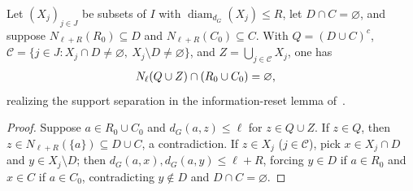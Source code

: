 \begin{lemma}
    \label{thm:qc_graph_support_separation}
    \leanok
    Let $(X_j)_{j\in J}$ be subsets of $I$ with $\operatorname{diam}_{d_G}(X_j)\le R$, let $D\cap C=\varnothing$, and suppose $N_{\ell+R}(R_0)\subseteq D$ and $N_{\ell+R}(C_0)\subseteq C$. With $Q=(D\cup C)^c$, $\mathcal C=\{j\in J:X_j\cap D\ne\varnothing,\ X_j\setminus D\ne\varnothing\}$, and $Z=\bigcup_{j\in\mathcal C}X_j$, one has
    \begin{align}
        N_\ell(Q\cup Z)\cap(R_0\cup C_0) & =\varnothing,\notag
    \end{align}
    realizing the support separation in the information-reset lemma of~\cite[Part~II]{TNLean2026OneDimensional}.
\end{lemma}
\begin{proof}\leanok
    Suppose $a\in R_0\cup C_0$ and $d_G(a,z)\le\ell$ for $z\in Q\cup Z$. If $z\in Q$, then $z\in N_{\ell+R}(\{a\})\subseteq D\cup C$, a contradiction. If $z\in X_j$ ($j\in\mathcal C$), pick $x\in X_j\cap D$ and $y\in X_j\setminus D$; then $d_G(a,x),d_G(a,y)\le\ell+R$, forcing $y\in D$ if $a\in R_0$ and $x\in C$ if $a\in C_0$, contradicting $y\notin D$ and $D\cap C=\varnothing$.
\end{proof}
